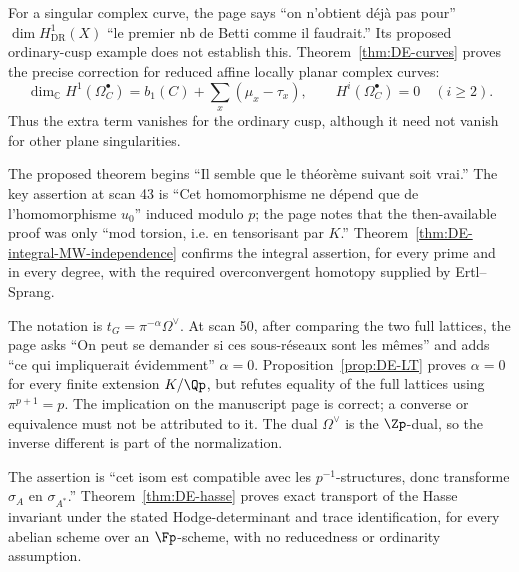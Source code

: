 \begin{remark}\label{rem:DE-quote-E5}
For a singular complex curve, the page says ``on n'obtient déjà pas pour'' $\dim H^1_{\mathrm{DR}}(X)$ ``le premier nb de Betti comme il faudrait.''  Its proposed ordinary-cusp example does not establish this.  Theorem~\ref{thm:DE-curves} proves the precise correction for reduced affine locally planar complex curves:
\[
 \dim_{\mathbb C}H^1(\Omega_C^\bullet)
 =b_1(C)+\sum_x(\mu_x-\tau_x),\qquad
 H^i(\Omega_C^\bullet)=0\quad(i\geq2).
\]
Thus the extra term vanishes for the ordinary cusp, although it need not vanish for other plane singularities.
\end{remark}

\begin{remark}\label{rem:DE-quote-E6}
The proposed theorem begins ``Il semble que le théorème suivant soit vrai.''  The key assertion at scan 43 is ``Cet homomorphisme ne dépend que de l'homomorphisme $u_0$'' induced modulo $p$; the page notes that the then-available proof was only ``mod torsion, i.e. en tensorisant par $K$.''  Theorem~\ref{thm:DE-integral-MW-independence} confirms the integral assertion, for every prime and in every degree, with the required overconvergent homotopy supplied by Ertl--Sprang.
\end{remark}

\begin{remark}\label{rem:DE-quote-E7}
The notation is $t_G=\pi^{-\alpha}\Omega^\vee$.  At scan 50, after comparing the two full lattices, the page asks ``On peut se demander si ces sous-réseaux sont les mêmes'' and adds ``ce qui impliquerait évidemment'' $\alpha=0$.  Proposition~\ref{prop:DE-LT} proves $\alpha=0$ for every finite extension $K/\Qp$, but refutes equality of the full lattices using $\pi^{p+1}=p$.  The implication on the manuscript page is correct; a converse or equivalence must not be attributed to it.  The dual $\Omega^\vee$ is the $\Zp$-dual, so the inverse different is part of the normalization.
\end{remark}

\begin{remark}\label{rem:DE-quote-E8}
The assertion is ``cet isom est compatible avec les $p^{-1}$-structures, donc transforme $\sigma_A$ en $\sigma_{A^*}$.''  Theorem~\ref{thm:DE-hasse} proves exact transport of the Hasse invariant under the stated Hodge-determinant and trace identification, for every abelian scheme over an $\Fp$-scheme, with no reducedness or ordinarity assumption.
\end{remark}

